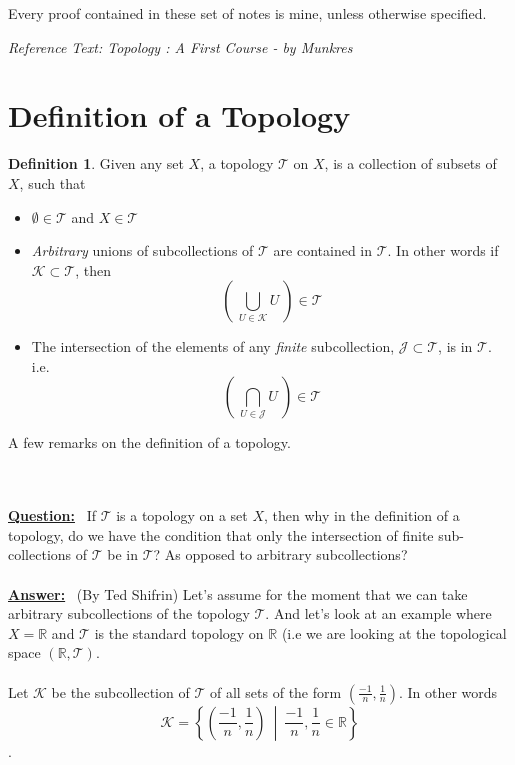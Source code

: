 \documentclass{article}
\theoremstyle{remark}
\theoremstyle{definition}
\newtheorem{definition}{Definition}[section]
\begin{document}
\begin{flushleft}
Every proof contained in these set of notes is mine, unless otherwise specified.

\end{flushleft}


\begin{flushleft}
\textit{Reference Text: Topology : A First Course - by Munkres}

\end{flushleft}

\newpage

\section{Definition of a Topology}
\medskip
\begin{definition}
Given any set $X$, a topology $\mathcal{T}$ on $X$, is a collection of subsets of $X$, such that

\begin{itemize}
  \item $\emptyset \in \mathcal{T}$ and $X \in \mathcal{T}$
  \item \textit{Arbitrary} unions of subcollections of $\mathcal{T}$ are contained in $\mathcal{T}$. In other words if $\mathcal{K} \subset \mathcal{T}$, then $$\left( \ \bigcup_{U \in \mathcal{K}}U \ \right) \in \mathcal{T}$$
  \item The intersection of the elements of any \textit{finite} subcollection, $\mathcal{J} \subset \mathcal{T}$, is in $\mathcal{T}$. i.e. $$\left( \ \bigcap_{U \in \mathcal{J}}U \ \right) \in \mathcal{T}$$
\end{itemize}
\end{definition}

\medskip
\hrulefill
\begin{flushleft}
A few remarks on the definition of a topology. 
\end{flushleft}
\\ \\
\textbf{\underline{Question:}} 
\ If $\mathcal{T}$ is a topology on a set $X$, then why in the definition of a topology, do we have the condition that only the intersection of finite sub-collections of $\mathcal{T}$ be in $\mathcal{T}$? As opposed to arbitrary subcollections?
\\ \\
\textbf{\underline{Answer:}}  
\ (By Ted Shifrin) Let's assume for the moment that we can take arbitrary subcollections of the topology $\mathcal{T}$. And let's look at an example where $X = \mathbb{R}$ and $\mathcal{T}$ is the standard topology on $\mathbb{R}$ (i.e we are looking at the topological space $(\mathbb{R}, \mathcal{T})$.
\\ \\
Let $\mathcal{K}$ be the subcollection of $\mathcal{T}$ of all sets of the form $(\frac{-1}{n}, \frac{1}{n})$. In other words $$\mathcal{K} = \left\{\left(\frac{-1}{n}, \frac{1}{n}\right) \ \middle| \ \frac{-1}{n}, \frac{1}{n} \in \mathbb{R}\right\}$$.
\end{document}
